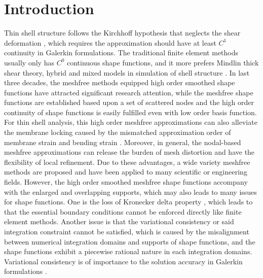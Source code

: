 \section{Introduction}\label{introduction}
Thin shell structure follows the Kirchhoff hypothesis that neglects the shear deformation \cite{donnell1976}, which requires the approximation should have at least $C^1$ continuity in Galerkin formulations.
The traditional finite element methods usually only has $C^0$ continuous shape functions, and it more prefers Mindlin thick shear theory, hybrid and mixed models in simulation of shell structure \cite{hughes2000}.
In last three decades, the meshfree methods \cite{belytschko1994, liu1995, chen2017a} equipped high order smoothed shape functions have attracted significant research attention, while the meshfree shape functions are established based upon a set of scattered nodes and the high order continuity of shape functions is easily fulfilled even with low order basis function.
For thin shell analysis, this high order meshfree approximations can also alleviate the membrane locking caused by the mismatched approximation order of membrane strain and bending strain \cite{krysl1996}.
Moreover, in general, the nodal-based meshfree approximations can release the burden of mesh distortion and have the flexibility of local refinement.
Due to these advantages, a wide variety meshfree methods are proposed and have been applied to many scientific or engineering fields. 
However, the high order smoothed meshfree shape functions accompany with the enlarged and overlapping supports, which may also leads to many issues for shape functions. One is the loss of Kronecker delta property \cite{fernandez-mendez2004}, which leads to that the essential boundary conditions cannot be enforced directly like finite element methods.  
Another issue is that the variational consistency or said integration constraint cannot be satisfied, which is caused by the misalignment between numerical integration domains and supports of shape functions, and the shape functions exhibit a piecewise rational nature in each integration domains.
Variational consistency is of importance to the solution accuracy in Galerkin formulations \cite{wu2021}.

